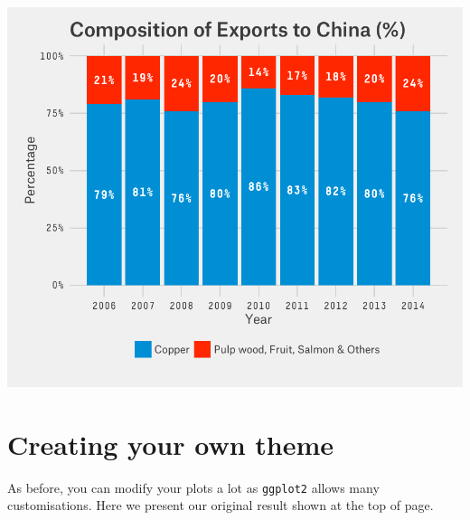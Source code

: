 \begin{center}\includegraphics[width=0.6\linewidth]{4_Stacked_Bar_pdf/stacked_12-1} \end{center}

\section{Creating your own theme}\label{creating-your-own-theme}

As before, you can modify your plots a lot as \texttt{ggplot2} allows
many customisations. Here we present our original result shown at the
top of page.

